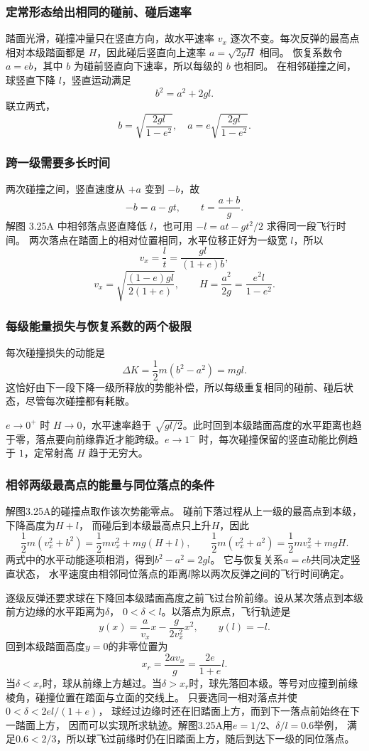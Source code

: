 \documentclass[UTF8,fontset=fandol,a4paper,11pt]{ctexart}
\begin{document}
\subsubsection*{定常形态给出相同的碰前、碰后速率}
踏面光滑，碰撞冲量只在竖直方向，故水平速率 $v_x$ 逐次不变。每次反弹的最高点相对本级踏面都是 $H$，因此碰后竖直向上速率 $a=\sqrt{2gH}$ 相同。
恢复系数令 $a=eb$，其中 $b$ 为碰前竖直向下速率，所以每级的 $b$ 也相同。
在相邻碰撞之间，球竖直下降 $l$，竖直运动满足
\[
b^2=a^2+2gl.
\]
联立两式，
\[
\boxed{b=\sqrt{\frac{2gl}{1-e^2}},\quad
a=e\sqrt{\frac{2gl}{1-e^2}}}.
\]

\subsubsection*{跨一级需要多长时间}
两次碰撞之间，竖直速度从 $+a$ 变到 $-b$，故
\[
-b=a-gt,\qquad t=\frac{a+b}{g}.
\]
解图 3.25A 中相邻落点竖直降低 $l$，也可用
$-l=at-gt^2/2$ 求得同一段飞行时间。
两次落点在踏面上的相对位置相同，水平位移正好为一级宽 $l$，所以
\[
v_x=\frac{l}{t}=\frac{gl}{(1+e)b},
\]
\[
\boxed{v_x=\sqrt{\frac{(1-e)gl}{2(1+e)}}},\qquad
\boxed{H=\frac{a^2}{2g}=\frac{e^2l}{1-e^2}}.
\]

\subsubsection*{每级能量损失与恢复系数的两个极限}
每次碰撞损失的动能是
\[
\Delta K=\frac12m(b^2-a^2)=mgl.
\]
这恰好由下一段下降一级所释放的势能补偿，所以每级重复相同的碰前、碰后状态，尽管每次碰撞都有耗散。

$e\to0^+$ 时 $H\to0$，水平速率趋于 $\sqrt{gl/2}$。此时回到本级踏面高度的水平距离也趋于零，落点要向前缘靠近才能跨级。$e\to1^-$ 时，每次碰撞保留的竖直动能比例趋于 $1$，定常射高 $H$ 趋于无穷大。
\subsubsection*{相邻两级最高点的能量与同位落点的条件}
解图3.25A的碰撞点取作该次势能零点。
碰前下落过程从上一级的最高点到本级，下降高度为$H+l$，
而碰后到本级最高点只上升$H$，因此
\[
\frac12m(v_x^2+b^2)=\frac12mv_x^2+mg(H+l),\qquad
\frac12m(v_x^2+a^2)=\frac12mv_x^2+mgH.
\]
两式中的水平动能逐项相消，得到$b^2-a^2=2gl$。
它与恢复关系$a=eb$共同决定竖直状态，
水平速度由相邻同位落点的距离$l$除以两次反弹之间的飞行时间确定。

逐级反弹还要求球在下降回本级踏面高度之前飞过台阶前缘。设从某次落点到本级前方边缘的水平距离为$\delta$，
$0<\delta<l$。以落点为原点，飞行轨迹是
\[
y(x)=\frac{a}{v_x}x-\frac{g}{2v_x^2}x^2,
\qquad y(l)=-l.
\]
回到本级踏面高度$y=0$的非零位置为
\[
x_r=\frac{2av_x}{g}=\frac{2e}{1+e}l.
\]
当$\delta<x_r$时，球从前缘上方越过。当$\delta>x_r$时，球先落回本级。等号对应撞到前缘棱角，碰撞位置在踏面与立面的交线上。
只要选同一相对落点并使$0<\delta<2el/(1+e)$，
球经过边缘时还在旧踏面上方，而到下一落点前始终在下一踏面上方，
因而可以实现所求轨迹。解图3.25A用$e=1/2$、$\delta/l=0.6$举例，
满足$0.6<2/3$，所以球飞过前缘时仍在旧踏面上方，随后到达下一级的同位落点。
\end{document}
